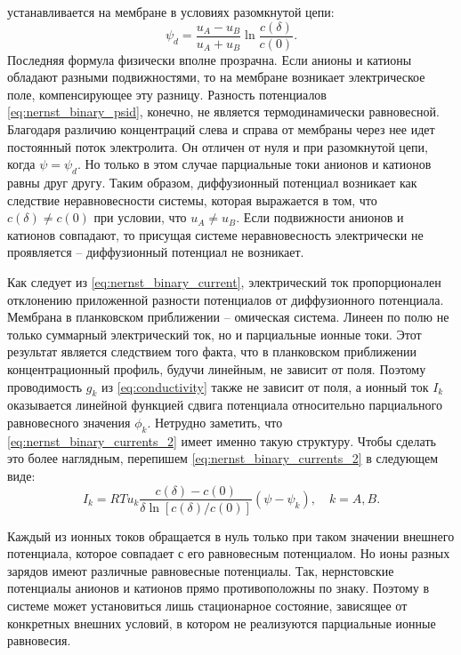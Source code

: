 устанавливается на мембране в условиях разомкнутой цепи:
\begin{equation}
    \psi_d = \frac{u_A - u_B}{u_A + u_B}\ln\frac{c(\delta)}{c(0)}.
    \label{eq:nernst_binary_psid}
\end{equation}
Последняя формула физически вполне прозрачна. Если анионы и катионы обладают
разными подвижностями, то на мембране возникает электрическое поле,
компенсирующее эту разницу. Разность потенциалов \eqref{eq:nernst_binary_psid},
конечно, не является термодинамически равновесной. Благодаря различию
концентраций слева и справа от мембраны через нее идет постоянный поток
электролита. Он отличен от нуля и при разомкнутой цепи, когда
\( \psi = \psi_d \). Но только в этом случае парциальные токи анионов и катионов
равны друг другу. Таким образом, диффузионный потенциал возникает как следствие
неравновесности системы, которая выражается в том, что \( c(\delta) \neq c(0) \)
при условии, что \( u_A \neq u_B \). Если подвижности анионов и катионов
совпадают, то присущая системе неравновесность электрически не проявляется --
диффузионный потенциал не возникает.

Как следует из \eqref{eq:nernst_binary_current}, электрический ток
пропорционален отклонению приложенной разности потенциалов от диффузионного
потенциала. Мембрана в планковском приближении -- омическая система. Линеен по
полю не только суммарный электрический ток, но и парциальные ионные токи. Этот
результат является следствием того факта, что в планковском приближении
концентрационный профиль, будучи линейным, не зависит от поля. Поэтому
проводимость \(g_k\) из \eqref{eq:conductivity} также не зависит от поля, а
ионный ток \( I_k \) оказывается линейной функцией сдвига потенциала
относительно парциального равновесного значения \( \phi_k \). Нетрудно заметить,
что \eqref{eq:nernst_binary_currents_2} имеет именно такую структуру. Чтобы
сделать это более наглядным, перепишем \eqref{eq:nernst_binary_currents_2}
в следующем виде:
\begin{equation}
    I_k = RTu_k\frac{c(\delta) - c(0)}{\delta\ln[c(\delta)/c(0)]}(\psi-\psi_k),
    \quad k = A,B.
\end{equation}

Каждый из ионных токов обращается в нуль только при таком значении внешнего
потенциала, которое совпадает с его равновесным потенциалом. Но ионы разных
зарядов имеют различные равновесные потенциалы. Так, нернстовские потенциалы
анионов и катионов прямо противоположны по знаку. Поэтому в системе может
установиться лишь стационарное состояние, зависящее от конкретных внешних
условий, в котором не реализуются парциальные ионные равновесия.

